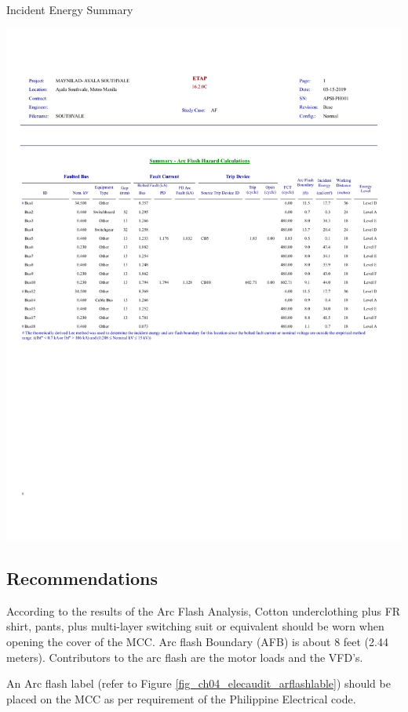 \begin{table}
	\caption{Incident Energy Summary}
	\label{tbl_ch04_elecaudit_incidenenergysummary}
		\includegraphics[width=\textwidth]{tables/tbl_ch04_elecaudit_arcflashsummary} \\

\end{table}


\subsection{Recommendations}
According to the results of the Arc Flash Analysis, Cotton underclothing plus FR shirt, pants, plus multi-layer switching suit or equivalent should be worn when opening the cover of the MCC. Arc flash Boundary (AFB)  is about 8 feet (2.44 meters).  Contributors to the arc flash are the motor loads and the VFD’s.

An Arc flash label (refer to Figure \ref{fig_ch04_elecaudit_arflashlable}) should be placed on the MCC as per requirement of the Philippine Electrical code.

